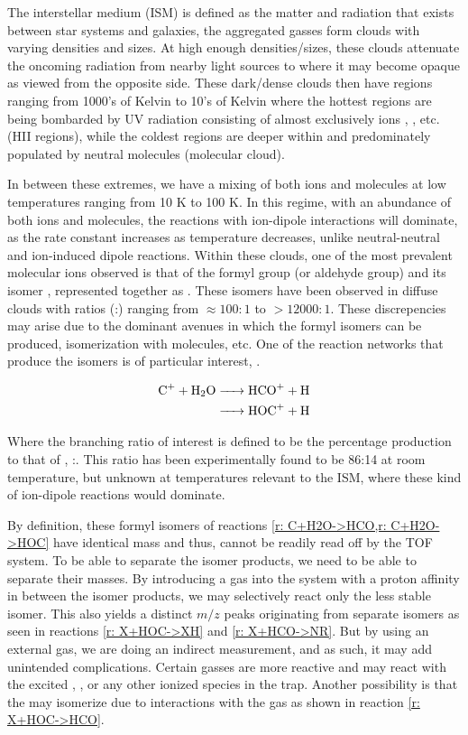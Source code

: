 The interstellar medium (ISM) is defined as the matter and radiation that exists between star systems and galaxies, the aggregated gasses form clouds with varying densities and sizes. At high enough densities/sizes, these clouds attenuate the oncoming radiation from nearby light sources to where it may become opaque as viewed from the opposite side. These dark/dense clouds then have regions ranging from 1000's of Kelvin to 10's of Kelvin where the hottest regions are being bombarded by UV radiation consisting of almost exclusively ions , , etc. (HII regions), while the coldest regions are deeper within and predominately populated by neutral molecules (molecular cloud).

In between these extremes, we have a mixing of both ions and molecules at low temperatures ranging from 10 K to 100 K. In this regime, with an abundance of both ions and molecules, the reactions with ion-dipole interactions will dominate, as the rate constant increases as temperature decreases, unlike neutral-neutral and ion-induced dipole reactions. Within these clouds, one of the most prevalent molecular ions observed is that of the formyl group (or aldehyde group)  and its isomer , represented together as \ce{[HCO]+}. These isomers have been observed in diffuse clouds with ratios (:) ranging from $\approx100:1$ to $>12000:1$. These discrepencies may arise due to the dominant avenues in which the formyl isomers can be produced, isomerization with  molecules, etc. One of the reaction networks that produce the isomers is of particular interest, .

\begin{align}
	\ce{C+ + H2O & -> HCO+ + H} \label{r: C+H2O->HCO} \\
	\ce{& -> HOC+ + H} \label{r: C+H2O->HOC}
\end{align}

Where the branching ratio of interest is defined to be the percentage  production to that of , :. This ratio has been experimentally found to be 86:14 at room temperature\cite{Love1987}, but unknown at temperatures relevant to the ISM, where these kind of ion-dipole reactions would dominate.

By definition, these formyl isomers of reactions \cref{r: C+H2O->HCO,r: C+H2O->HOC} have identical mass and thus, cannot be readily read off by the TOF system. To be able to separate the isomer products, we need to be able to separate their masses. By introducing a gas into the system with a proton affinity in between the isomer products, we may selectively react only the less stable  isomer. This also yields a distinct $m/z$ peaks originating from separate isomers as seen in reactions \ref{r: X+HOC->XH} and \ref{r: X+HCO->NR}. But by using an external gas, we are doing an indirect measurement, and as such, it may add unintended complications. Certain gasses are more reactive and may react with the excited , , or any other ionized species in the trap. Another possibility is that the  may isomerize due to interactions with the gas as shown in reaction \ref{r: X+HOC->HCO}.\cite{Love1987}

